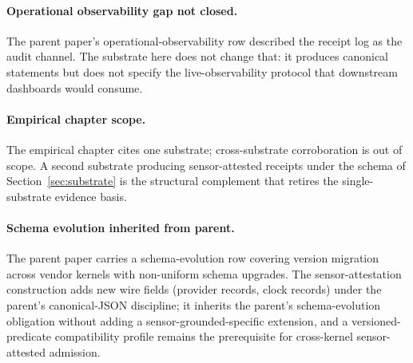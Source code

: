 \paragraph{Operational observability gap not closed.}
The parent paper's operational-observability row described the receipt log as the audit channel. The substrate here does not change that: it produces canonical statements but does not specify the live-observability protocol that downstream dashboards would consume.

\paragraph{Empirical chapter scope.}
The empirical chapter cites one substrate; cross-substrate corroboration is out of scope. A second substrate producing sensor-attested receipts under the schema of Section~\ref{sec:substrate} is the structural complement that retires the single-substrate evidence basis.

\paragraph{Schema evolution inherited from parent.}
The parent paper carries a schema-evolution row covering version migration across vendor kernels with non-uniform schema upgrades. The sensor-attestation construction adds new wire fields (provider records, clock records) under the parent's canonical-JSON discipline; it inherits the parent's schema-evolution obligation without adding a sensor-grounded-specific extension, and a versioned-predicate compatibility profile remains the prerequisite for cross-kernel sensor-attested admission.
